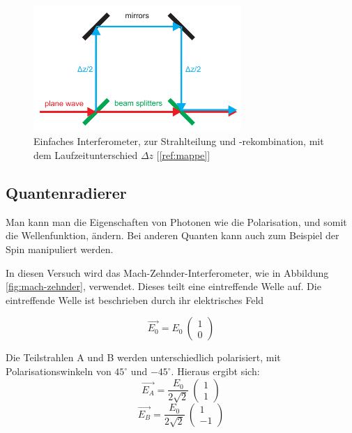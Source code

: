\documentclass[a4paper,ngerman]{scrartcl}
\begin{document}
\begin{figure}
\includegraphics[width=0.7\textwidth]{interferomter-einfach.png}
\caption{Einfaches Interferometer, zur Strahlteilung und -rekombination, mit dem Laufzeitunterschied $\Delta z$ [\ref{ref:mappe}]}
\label{fig: Interferometer-einfach}
\end{figure}

\subsection{Quantenradierer}
\label{ssec:quantenradierer}

Man kann man die Eigenschaften von Photonen wie die Polarisation, und somit die Wellenfunktion, ändern. 
Bei anderen Quanten kann auch zum Beispiel der Spin manipuliert werden.

In diesen Versuch wird das Mach-Zehnder-Interferometer, wie in Abbildung \ref{fig:mach-zehnder}, verwendet. Dieses teilt eine eintreffende Welle auf. Die eintreffende Welle ist beschrieben durch ihr elektrisches Feld
 
\begin{equation}
\vec{E_0} = E_0 \ \begin{pmatrix} 1\\ 0 \end{pmatrix}
\end{equation}

Die Teilstrahlen A 	und B werden unterschiedlich polarisiert, mit Polarisationswinkeln von $45^{\circ}$ und $-45^{\circ}$. 
Hieraus ergibt sich:
\begin{equation}
\vec{E_A} = \frac{E_0}{2 \sqrt{2}} \ \begin{pmatrix} 1\\ 1 \end{pmatrix}
\end{equation}
\begin{equation}
\vec{E_B} = \frac{E_0}{2 \sqrt{2}} \ \begin{pmatrix} 1\\ -1 \end{pmatrix}
\end{equation}
\end{document}
